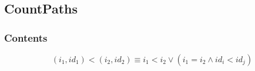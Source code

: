 \documentclass[english, aspectratio=169]{beamer}
\begin{document}
\subsection{CountPaths}

\begin{frame}{}
  \frametitle{Contents}
\end{frame}

\begin{frame}

  \begin{center}
    \begin{tikzpicture}[scale=0.9, every node/.style={transform shape}]
      
    \end{tikzpicture}
  \end{center}
  \vspace{20pt}
  \begin{equation*}
    (i_1, \mathit{id}_1) < (i_2, \mathit{id}_2)
    \equiv
    i_1 < i_2 \vee (i_1 = i_2 \wedge \mathit{id}_i < \mathit{id}_j)
  \end{equation*}
\end{frame}
\end{document}
